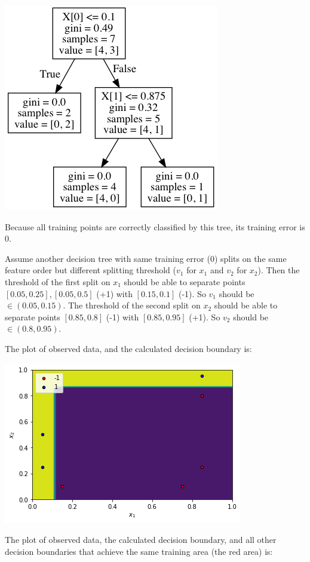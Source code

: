 \documentclass[paper=letter, fontsize=12pt]{article}
\begin{document}
\begin{enumerate}[label=(\alph*)]
	\includegraphics[scale=0.6]{q1b_tree.png}
	
	Because all training points are correctly classified by this tree, its training error is 0.
	
	Assume another decision tree with same training error (0) splits on the same feature order but different splitting threshold ($v_1$ for $x_1$ and $v_2$ for $x_2$). Then the threshold of the first split on $x_1$ should be able to separate points $[0.05, 0.25], [0.05, 0.5]$ (+1) with $[0.15, 0.1]$ (-1). So $v_1$ should be $\in (0.05, 0.15)$. The threshold of the second split on $x_2$ should be able to separate points $[0.85, 0.8]$ (-1) with $[0.85, 0.95]$ (+1). So $v_2$ should be $\in (0.8, 0.95)$.
	
	The plot of observed data, and the calculated decision boundary is:
	
	\includegraphics[scale=0.6]{q1b1.png}
	
	The plot of observed data, the calculated decision boundary, and all other decision boundaries that achieve the same training area (the red area) is:
	

\end{enumerate}
\end{document}

